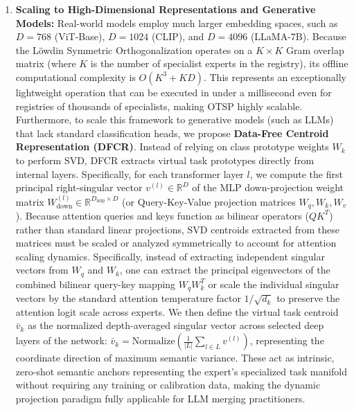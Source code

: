 \begin{enumerate}
    \item \textbf{Scaling to High-Dimensional Representations and Generative Models:} Real-world models employ much larger embedding spaces, such as $D=768$ (ViT-Base), $D=1024$ (CLIP), and $D=4096$ (LLaMA-7B). Because the L{\"o}wdin Symmetric Orthogonalization operates on a $K \times K$ Gram overlap matrix (where $K$ is the number of specialist experts in the registry), its offline computational complexity is $O(K^3 + K D)$. This represents an exceptionally lightweight operation that can be executed in under a millisecond even for registries of thousands of specialists, making OTSP highly scalable. Furthermore, to scale this framework to generative models (such as LLMs) that lack standard classification heads, we propose \textbf{Data-Free Centroid Representation (DFCR)}. Instead of relying on class prototype weights $W_k$ to perform SVD, DFCR extracts virtual task prototypes directly from internal layers. Specifically, for each transformer layer $l$, we compute the first principal right-singular vector $v^{(l)} \in \mathbb{R}^D$ of the MLP down-projection weight matrix $W_{\text{down}}^{(l)} \in \mathbb{R}^{D_{\text{mlp}} \times D}$ (or Query-Key-Value projection matrices $W_q, W_k, W_v$). Because attention queries and keys function as bilinear operators ($Q K^T$) rather than standard linear projections, SVD centroids extracted from these matrices must be scaled or analyzed symmetrically to account for attention scaling dynamics. Specifically, instead of extracting independent singular vectors from $W_q$ and $W_k$, one can extract the principal eigenvectors of the combined bilinear query-key mapping $W_q W_k^T$ or scale the individual singular vectors by the standard attention temperature factor $1 / \sqrt{d_k}$ to preserve the attention logit scale across experts. We then define the virtual task centroid $\bar{v}_k$ as the normalized depth-averaged singular vector across selected deep layers of the network: $\bar{v}_k = \text{Normalize}(\frac{1}{|L|}\sum_{l \in L} v^{(l)})$, representing the coordinate direction of maximum semantic variance. These act as intrinsic, zero-shot semantic anchors representing the expert's specialized task manifold without requiring any training or calibration data, making the dynamic projection paradigm fully applicable for LLM merging practitioners.

\end{enumerate}
